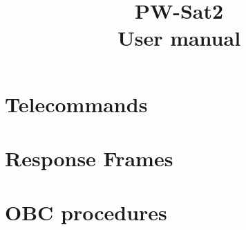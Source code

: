 \documentclass{book}
\title{PW-Sat2\\User manual}
\author{}
\begin{document}
\maketitle


\tableofcontents

\chapter{Telecommands}







\chapter{Response Frames}


\chapter{OBC procedures}


\newpage
\todolist
\end{document}
